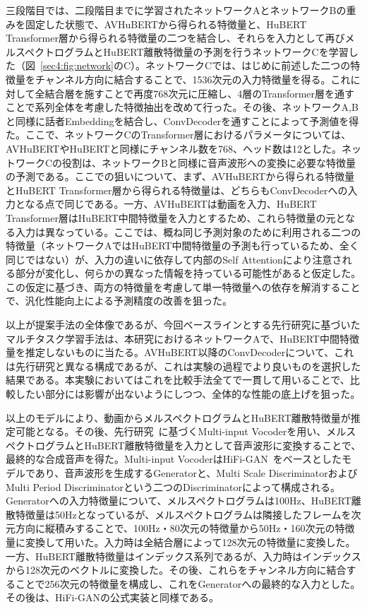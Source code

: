 \documentclass[12pt]{jarticle}
\numberwithin{equation}{section}    %
\numberwithin{figure}{section}      %
\numberwithin{table}{section}      %
\begin{document}
三段階目では、二段階目までに学習されたネットワークAとネットワークBの重みを固定した状態で、AVHuBERTから得られる特徴量と、HuBERT Transformer層から得られる特徴量の二つを結合し、それらを入力として再びメルスペクトログラムとHuBERT離散特徴量の予測を行うネットワークCを学習した（図~\ref{sec4:fig:network}のC）。ネットワークCでは、はじめに前述した二つの特徴量をチャンネル方向に結合することで、1536次元の入力特徴量を得る。これに対して全結合層を施すことで再度768次元に圧縮し、4層のTransformer層を通すことで系列全体を考慮した特徴抽出を改めて行った。その後、ネットワークA,Bと同様に話者Embeddingを結合し、ConvDecoderを通すことによって予測値を得た。ここで、ネットワークCのTransformer層におけるパラメータについては、AVHuBERTやHuBERTと同様にチャンネル数を768、ヘッド数は12とした。ネットワークCの役割は、ネットワークBと同様に音声波形への変換に必要な特徴量の予測である。ここでの狙いについて、まず、AVHuBERTから得られる特徴量とHuBERT Transformer層から得られる特徴量は、どちらもConvDecoderへの入力となる点で同じである。一方、AVHuBERTは動画を入力、HuBERT Transformer層はHuBERT中間特徴量を入力とするため、これら特徴量の元となる入力は異なっている。ここでは、概ね同じ予測対象のために利用される二つの特徴量（ネットワークAではHuBERT中間特徴量の予測も行っているため、全く同じではない）が、入力の違いに依存して内部のSelf Attentionにより注意される部分が変化し、何らかの異なった情報を持っている可能性があると仮定した。この仮定に基づき、両方の特徴量を考慮して単一特徴量への依存を解消することで、汎化性能向上による予測精度の改善を狙った。

以上が提案手法の全体像であるが、今回ベースラインとする先行研究\cite{choi2023intelligible}に基づいたマルチタスク学習手法は、本研究におけるネットワークAで、HuBERT中間特徴量を推定しないものに当たる。AVHuBERT以降のConvDecoderについて、これは先行研究と異なる構成であるが、これは実験の過程でより良いものを選択した結果である。本実験においてはこれを比較手法全てで一貫して用いることで、比較したい部分には影響が出ないようにしつつ、全体的な性能の底上げを狙った。

以上のモデルにより、動画からメルスペクトログラムとHuBERT離散特徴量が推定可能となる。その後、先行研究~\cite{choi2023intelligible}に基づくMulti-input Vocoderを用い、メルスペクトログラムとHuBERT離散特徴量を入力として音声波形に変換することで、最終的な合成音声を得た。Multi-input VocoderはHiFi-GAN~\cite{kong2020hifi}をベースとしたモデルであり、音声波形を生成するGeneratorと、Multi Scale DiscriminatorおよびMulti Period Discriminatorという二つのDiscriminatorによって構成される。Generatorへの入力特徴量について、メルスペクトログラムは100Hz、HuBERT離散特徴量は50Hzとなっているが、メルスペクトログラムは隣接したフレームを次元方向に縦積みすることで、100Hz・80次元の特徴量から50Hz・160次元の特徴量に変換して用いた。入力時は全結合層によって128次元の特徴量に変換した。一方、HuBERT離散特徴量はインデックス系列であるが、入力時はインデックスから128次元のベクトルに変換した。その後、これらをチャンネル方向に結合することで256次元の特徴量を構成し、これをGeneratorへの最終的な入力とした。その後は、HiFi-GANの公式実装と同様である。
\end{document}
